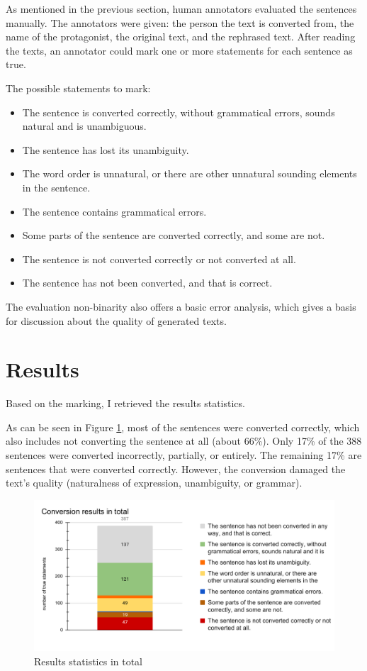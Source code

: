 As mentioned in the previous section, human annotators evaluated the sentences manually. The annotators were given: the person the text is converted from, the name of the protagonist, the original text, and the rephrased text. After reading the texts, an annotator could mark one or more statements for each sentence as true.

The possible statements to mark:

\begin{itemize}
	\item The sentence is converted correctly, without grammatical errors, sounds natural and is unambiguous.
	\item The sentence has lost its unambiguity.
	\item The word order is unnatural, or there are other unnatural sounding elements in the sentence.
	\item The sentence contains grammatical errors.
	\item Some parts of the sentence are converted correctly, and some are not.
	\item The sentence is not converted correctly or not converted at all.
	\item The sentence has not been converted, and that is correct.
\end{itemize}

The evaluation non-binarity also offers a basic error analysis, which gives a basis for discussion about the quality of generated texts.

\section{Results}

Based on the marking, I retrieved the results statistics.

As can be seen in Figure \ref{fig:eval-total}, most of the sentences were converted correctly, which also includes not converting the sentence at all (about 66\%). Only 17\% of the 388 sentences were converted incorrectly, partially, or entirely. The remaining 17\% are sentences that were converted correctly. However, the conversion damaged the text's quality (naturalness of expression, unambiguity, or grammar).

\begin{figure}[!ht]
\includegraphics[width=\textwidth]{data/Eval-Total.pdf}
\caption{Results statistics in total}
\label{fig:eval-total}
\end{figure}

